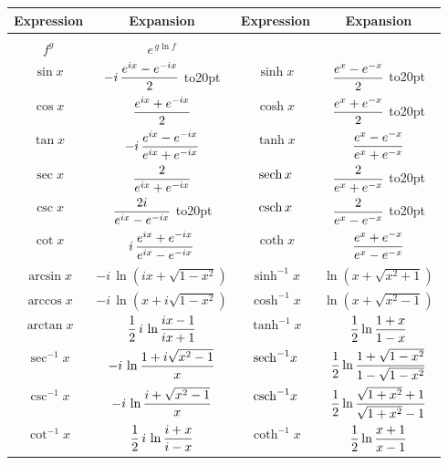 \begin{center}
\begin{tabular}{c c c c @{\bigskip}}
Expression & \multicolumn{1}{c}{Expansion} &
Expression & \multicolumn{1}{c}{Expansion} \\
\hline
& \\
$f^g$ & $\displaystyle e^{\,g \ln f}$ &
 & \\
$\sin x$ & $\displaystyle {-i \,{{e^{ix} - e^{-ix}}\over 2}}$ \vbox to20pt{}&
 $\sinh x$ & $\displaystyle {{e^{x} - e^{-x}}\over 2}$ \vbox to20pt{} \\
$\cos x$ & $\displaystyle {{e^{ix} + e^{-ix}}\over 2}$ &
 $\cosh x$ & $\displaystyle {{e^{x} + e^{-x}}\over 2}$ \vbox to20pt{} \\
$\tan x$ & $\displaystyle {-i \,{{e^{ix}-e^{-ix}}\over {e^{ix}+e^{-ix}}}}$ &
 $\tanh x$ & $\displaystyle {{e^{x}-e^{-x}}\over {e^{x}+e^{-x}}}$ \\

$\sec x$ & $\displaystyle {2\over{e^{ix} + e^{-ix}}}$ &
 ${\rm sech}\, x$ & $\displaystyle {2\over{e^{x} + e^{-x}}}$ \vbox to20pt{} \\
$\csc x$ & $\displaystyle {{2i}\over{e^{ix} - e^{-ix}}}$ \vbox to20pt{}&
 ${\rm csch}\, x$ & $\displaystyle {2\over{e^{x} - e^{-x}}}$ \vbox to20pt{} \\
$\cot x$ & $\displaystyle {i \,{{e^{ix}+e^{-ix}}\over {e^{ix}-e^{-ix}}}}$ &
 $\coth x$ & $\displaystyle {{e^{x}+e^{-x}}\over {e^{x}-e^{-x}}}$ \\

$\arcsin x$ & $\displaystyle -i \,\ln (ix + \sqrt{1-x^2})$ &
 $\sinh^{-1} x$ & $\displaystyle \ln (x + \sqrt{x^2+1})$ \\
$\arccos x$ & $\displaystyle -i \,\ln (x + i\sqrt{1-x^2})$ &
 $\cosh^{-1} x$ & $\displaystyle \ln (x + \sqrt{x^2-1})$ \\
$\arctan x$ & $\displaystyle {1\over2}\,i\,\ln {{ix-1}\over{ix+1}}$ &
 $\tanh^{-1} x$ & $\displaystyle {1\over2} \ln {{1+x}\over{1-x}}$ \\

$\sec^{-1} x$ & $\displaystyle -i \,\ln {{1 + i\sqrt{x^2-1}}\over{x}}$ &
 ${\rm sech}^{-1} x$ & $\displaystyle {1\over2} \ln {{1+\sqrt{1-x^2}}\over{1-\sqrt{1-x^2}}}$ \\
$\csc^{-1} x$ & $\displaystyle -i \,\ln {{i + \sqrt{x^2-1}}\over{x}}$ &
 ${\rm csch}^{-1} x$ & $\displaystyle {1\over2} \ln {{\sqrt{1+x^2}+1}\over{\sqrt{1+x^2}-1}}$ \\
$\cot^{-1} x$ & $\displaystyle {1\over2}\,i\,\ln {{i+x}\over{i-x}}$ &
 $\coth^{-1} x$ & $\displaystyle {1\over2} \ln {{x+1}\over{x-1}}$ \\

\end{tabular}
\end{center}

